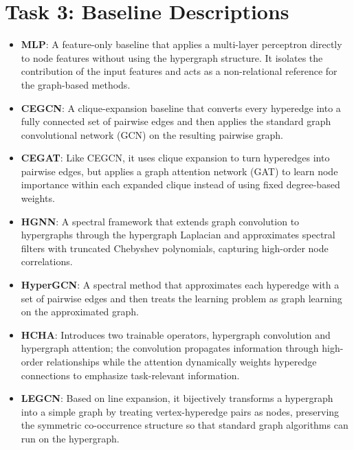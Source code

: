 \documentclass[11pt,a4paper]{article}
\begin{document}
\section*{Task 3: Baseline Descriptions}
\begin{itemize}
\item \textbf{MLP}: A feature-only baseline that applies a multi-layer perceptron directly to node features without using the hypergraph structure. It isolates the contribution of the input features and acts as a non-relational reference for the graph-based methods.
\item \textbf{CEGCN}\cite{chien2022allset}: A clique-expansion baseline that converts every hyperedge into a fully connected set of pairwise edges and then applies the standard graph convolutional network (GCN) on the resulting pairwise graph.
\item \textbf{CEGAT}\cite{chien2022allset}: Like CEGCN, it uses clique expansion to turn hyperedges into pairwise edges, but applies a graph attention network (GAT) to learn node importance within each expanded clique instead of using fixed degree-based weights.
\item \textbf{HGNN}\cite{feng2019hgnn}: A spectral framework that extends graph convolution to hypergraphs through the hypergraph Laplacian and approximates spectral filters with truncated Chebyshev polynomials, capturing high-order node correlations.
\item \textbf{HyperGCN}\cite{yadati2019hypergcn}: A spectral method that approximates each hyperedge with a set of pairwise edges and then treats the learning problem as graph learning on the approximated graph.
\item \textbf{HCHA}\cite{bai2021hcha}: Introduces two trainable operators, hypergraph convolution and hypergraph attention; the convolution propagates information through high-order relationships while the attention dynamically weights hyperedge connections to emphasize task-relevant information.
\item \textbf{LEGCN}\cite{yang2022legcn}: Based on line expansion, it bijectively transforms a hypergraph into a simple graph by treating vertex-hyperedge pairs as nodes, preserving the symmetric co-occurrence structure so that standard graph algorithms can run on the hypergraph.

\end{itemize}
\end{document}
